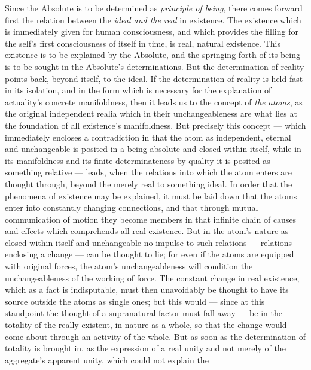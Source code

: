 \documentclass[12pt,a4paper]{book}
\begin{document}
Since the Absolute is to be determined as \emph{principle of being}, there
comes forward first the relation between the \emph{ideal and the real} in
existence. The existence which is immediately given for human consciousness,
and which provides the filling for the self's first consciousness of itself in
time, is real, natural existence. This existence is to be explained by the
Absolute, and the springing-forth of its being is to be sought in the
Absolute's determinations. But the determination of reality points back,
beyond itself, to the ideal. If the determination of reality is held fast in
its isolation, and in the form which is necessary for the explanation of
actuality's concrete manifoldness, then it leads us to the concept of
\emph{the atoms}, as the original independent realia which in their
unchangeableness are what lies at the foundation of all existence's
manifoldness. But precisely this concept --- which immediately encloses a
contradiction in that the atom as independent, eternal and unchangeable is
posited in a being absolute and closed within itself, while in its
manifoldness and its finite determinateness by quality it is posited as
something relative --- leads, when the relations into which the atom enters
are thought through, beyond the merely real to something ideal. In order that
the phenomena of existence may be explained, it must be laid down that the
atoms enter into constantly changing connections, and that through mutual
communication of motion they become members in that infinite chain of causes
and effects which comprehends all real existence. But in the atom's nature as
closed within itself and unchangeable no impulse to such relations ---
relations enclosing a change --- can be thought to lie; for even if the atoms
are equipped with original forces, the atom's unchangeableness will condition
the unchangeableness of the working of force. The constant change in real
existence, which as a fact is indisputable, must then unavoidably be thought
to have its source outside the atoms as single ones; but this would --- since
at this standpoint the thought of a supranatural factor must fall away --- be
in the totality of the really existent, in nature as a whole, so that the
change would come about through an activity of the whole. But as soon as the
determination of totality is brought in, as the expression of a real unity and
not merely of the aggregate's apparent unity, which could not explain the
\end{document}
